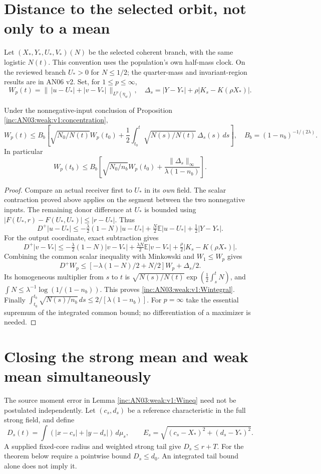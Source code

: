 \documentclass[11pt]{article}
\numberwithin{equation}{section}
\theoremstyle{remark}\newtheorem{remark}[theorem]{Remark}
\newcommand{\dd}{\,d}\newcommand{\E}{\mathbb E}\newcommand{\R}{\mathbb R}
\begin{document}
\section{Distance to the selected orbit, not only to a mean}
Let $(X_*,Y_*,U_*,V_*)(N)$ be the selected coherent branch, with the same logistic $N(t)$. This convention uses the population's own half-mass clock. On the reviewed branch $U_*>0$ for $N\le1/2$; the quarter-mass and invariant-region results are in AN06 v2.
Set, for $1\le p\le\infty$,
\[
 W_p(t)=\|\,|u-U_*|+|v-V_*|\,\|_{L^p(\eta_w)},\quad
 \Delta_s=|Y-Y_*|+\rho|K_s-K(\rho X_*)|.
\]
\begin{lemma}\label{inc:AN03:weak:v1:Wineq}
Under the nonnegative-input conclusion of Proposition \ref{inc:AN03:weak:v1:concentration},
\begin{equation}\label{inc:AN03:weak:v1:Wintegral}
 W_p(t)\le B_b\left[
 \sqrt{N_0/N(t)}W_p(t_0)+\frac12\int_{t_0}^t\sqrt{N(s)/N(t)}\,\Delta_s(s)\dd s\right],
 \quad B_b=(1-n_b)^{-1/(2\lambda)}.
\end{equation}
In particular
\[
 W_p(t_b)\le B_b\left[\sqrt{N_0/n_b}W_p(t_0)
              +\frac{\|\Delta_s\|_\infty}{\lambda(1-n_b)}\right].
\]
\end{lemma}
\begin{proof}
Compare an actual receiver first to $U_*$ in its \emph{own} field. The scalar contraction proved above applies on the segment between the two nonnegative inputs. The remaining donor difference at $U_*$ is bounded using $|F(U_*,r)-F(U_*,U_*)|\le|r-U_*|$. Thus
\[
 D^+|u-U_*|\le-\tfrac\lambda2(1-N)|u-U_*|
             +\tfrac N2\E|u-U_*|+\tfrac12|Y-Y_*|.
\]
For the output coordinate, exact subtraction gives
\[
 D^+|v-V_*|\le-\tfrac\lambda2(1-N)|v-V_*|
             +\tfrac{\lambda N}2\E|v-V_*|
             +\tfrac\rho2|K_s-K(\rho X_*)|.
\]
Combining the common scalar inequality with Minkowski and $W_1\le W_p$ gives
\[
 D^+W_p\le[-\lambda(1-N)/2+N/2]W_p+\Delta_s/2.
\]
Its homogeneous multiplier from $s$ to $t$ is
$\sqrt{N(s)/N(t)}\exp(\frac12\int_s^tN)$, and $\int N\le\lambda^{-1}\log(1/(1-n_b))$. This proves \eqref{inc:AN03:weak:v1:Wintegral}. Finally $\int_{t_0}^{t_b}\sqrt{N(s)/n_b}\dd s\le2/[\lambda(1-n_b)]$. For $p=\infty$ take the essential supremum of the integrated common bound; no differentiation of a maximizer is needed.
\end{proof}

\section{Closing the strong mean and weak mean simultaneously}
The source moment error in Lemma \ref{inc:AN03:weak:v1:Wineq} need not be postulated independently. Let $(c_s,d_s)$ be a reference characteristic in the full strong field, and define
\[
 D_s(t)=\int(|x-c_s|+|y-d_s|)\dd\mu_s,\qquad
 E_s=\sqrt{(c_s-X_*)^2+(d_s-Y_*)^2}.
\]
A supplied fixed-core radius and weighted strong tail give $D_s\le r+T$. For the theorem below require a pointwise bound $D_s\le d_0$. An integrated tail bound alone does not imply it.
\end{document}
